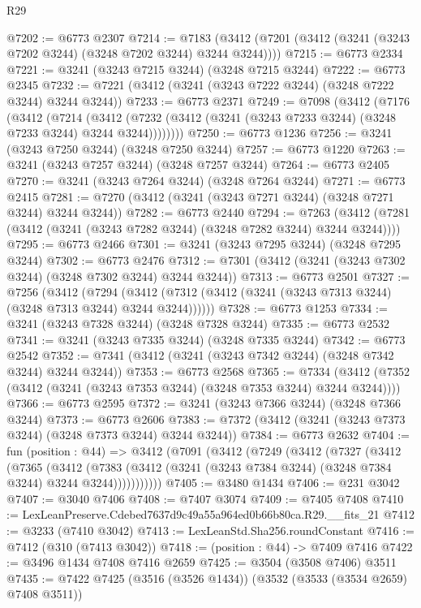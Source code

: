 \begin{lexlean}{R29}
\begin{coremodule}
@7202 := @6773 @2307
@7214 := @7183 (@3412 (@7201 (@3412 (@3241 (@3243 @7202 @3244) (@3248 @7202 @3244) @3244 @3244))))
@7215 := @6773 @2334
@7221 := @3241 (@3243 @7215 @3244) (@3248 @7215 @3244)
@7222 := @6773 @2345
@7232 := @7221 (@3412 (@3241 (@3243 @7222 @3244) (@3248 @7222 @3244) @3244 @3244))
@7233 := @6773 @2371
@7249 := @7098
    (@3412
      (@7176
        (@3412
          (@7214
            (@3412 (@7232 (@3412 (@3241 (@3243 @7233 @3244) (@3248 @7233 @3244) @3244 @3244))))))))
@7250 := @6773 @1236
@7256 := @3241 (@3243 @7250 @3244) (@3248 @7250 @3244)
@7257 := @6773 @1220
@7263 := @3241 (@3243 @7257 @3244) (@3248 @7257 @3244)
@7264 := @6773 @2405
@7270 := @3241 (@3243 @7264 @3244) (@3248 @7264 @3244)
@7271 := @6773 @2415
@7281 := @7270 (@3412 (@3241 (@3243 @7271 @3244) (@3248 @7271 @3244) @3244 @3244))
@7282 := @6773 @2440
@7294 := @7263 (@3412 (@7281 (@3412 (@3241 (@3243 @7282 @3244) (@3248 @7282 @3244) @3244 @3244))))
@7295 := @6773 @2466
@7301 := @3241 (@3243 @7295 @3244) (@3248 @7295 @3244)
@7302 := @6773 @2476
@7312 := @7301 (@3412 (@3241 (@3243 @7302 @3244) (@3248 @7302 @3244) @3244 @3244))
@7313 := @6773 @2501
@7327 := @7256
    (@3412
      (@7294 (@3412 (@7312 (@3412 (@3241 (@3243 @7313 @3244) (@3248 @7313 @3244) @3244 @3244))))))
@7328 := @6773 @1253
@7334 := @3241 (@3243 @7328 @3244) (@3248 @7328 @3244)
@7335 := @6773 @2532
@7341 := @3241 (@3243 @7335 @3244) (@3248 @7335 @3244)
@7342 := @6773 @2542
@7352 := @7341 (@3412 (@3241 (@3243 @7342 @3244) (@3248 @7342 @3244) @3244 @3244))
@7353 := @6773 @2568
@7365 := @7334 (@3412 (@7352 (@3412 (@3241 (@3243 @7353 @3244) (@3248 @7353 @3244) @3244 @3244))))
@7366 := @6773 @2595
@7372 := @3241 (@3243 @7366 @3244) (@3248 @7366 @3244)
@7373 := @6773 @2606
@7383 := @7372 (@3412 (@3241 (@3243 @7373 @3244) (@3248 @7373 @3244) @3244 @3244))
@7384 := @6773 @2632
@7404 := fun (position : @44) =>
  @3412
    (@7091
      (@3412
        (@7249
          (@3412
            (@7327
              (@3412
                (@7365
                  (@3412
                    (@7383
                      (@3412 (@3241 (@3243 @7384 @3244) (@3248 @7384 @3244) @3244 @3244)))))))))))
@7405 := @3480 @1434
@7406 := @231 @3042
@7407 := @3040 @7406
@7408 := @7407 @3074
@7409 := @7405 @7408
@7410 := LexLeanPreserve.Cdebed7637d9c49a55a964ed0b66b80ca.R29.__fits_21
@7412 := @3233 (@7410 @3042)
@7413 := LexLeanStd.Sha256.roundConstant
@7416 := @7412 (@310 (@7413 @3042))
@7418 := (position : @44) -> @7409 @7416
@7422 := @3496 @1434 @7408 @7416 @2659
@7425 := @3504 (@3508 @7406) @3511
@7435 := @7422 @7425 (@3516 (@3526 @1434)) (@3532 (@3533 (@3534 @2659) @7408 @3511))

\end{coremodule}
\end{lexlean}
